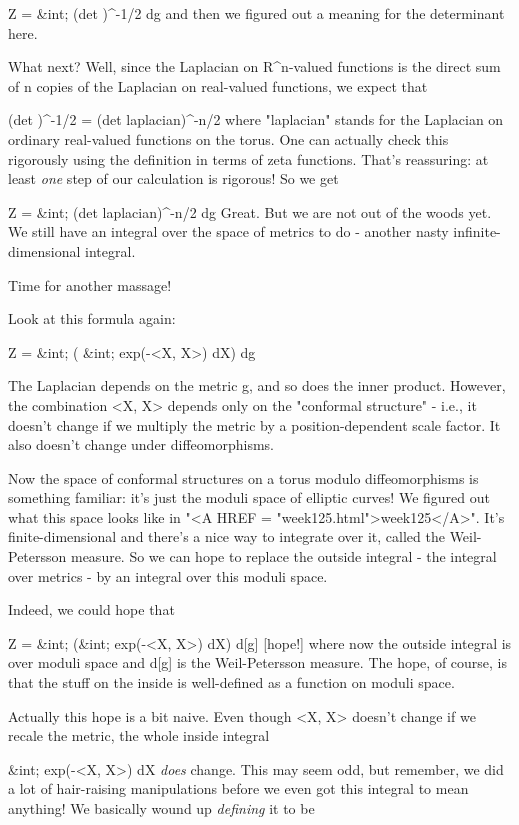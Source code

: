            Z = &int; (det \Delta )^{-1/2} dg
and then we figured out a meaning for the determinant here.

What next?  Well, since the Laplacian on R^{n}-valued functions is the 
direct sum of n copies of the Laplacian on real-valued functions, we 
expect that 

         (det \Delta )^{-1/2} = (det laplacian)^{-n/2}
where "laplacian" stands for the Laplacian on ordinary real-valued
functions on the torus.  One can actually check this rigorously using
the definition in terms of zeta functions.  That's reassuring: at 
least \emph{one} step of our calculation is rigorous!  So we get

                Z = &int; (det laplacian)^{-n/2} dg
Great.  But we are not out of the woods yet.  We still have an integral
over the space of metrics to do - another nasty infinite-dimensional
integral.

Time for another massage!

Look at this formula again:

            Z = &int; ( &int; exp(-<X, \Delta X>) dX) dg

The Laplacian depends on the metric g, and so does the inner product.
However, the combination <X, \Delta X> depends only on the
"conformal structure" - i.e., it doesn't change if we multiply
the metric by a position-dependent scale factor.  It also doesn't change
under diffeomorphisms.

Now the space of conformal structures on a torus modulo diffeomorphisms
is something familiar: it's just the moduli space of elliptic curves!
We figured out what this space looks like in "<A HREF =
"week125.html">week125</A>".  It's finite-dimensional and there's a
nice way to integrate over it, called the Weil-Petersson measure.  So we
can hope to replace the outside integral - the integral over metrics -
by an integral over this moduli space.

Indeed, we could hope that

      Z = &int; (&int; exp(-<X, \Delta X>) dX) d[g]   
      [hope!]
where now the outside integral is over moduli space and d[g] is 
the Weil-Petersson measure.  The hope, of course, is that the 
stuff on the inside is well-defined as a function on moduli space.

Actually this hope is a bit naive.  Even though <X, \Delta X> 
doesn't change if we recale the metric, the whole inside integral

            &int; exp(-<X, \Delta X>) dX 
\emph{does} change.  This may seem odd, but remember, we did a lot of
hair-raising manipulations before we even got this integral to mean
anything!  We basically wound up \emph{defining} it to be 


